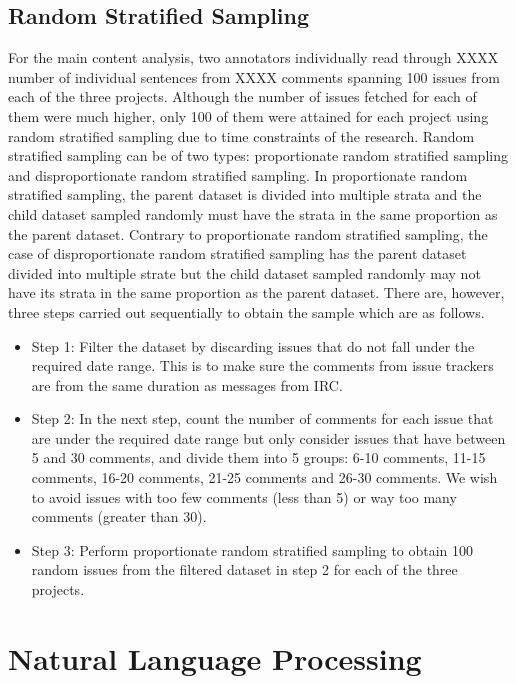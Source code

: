 \documentclass[a4paper,12pt,twoside]{report}
\begin{document}
\section{Random Stratified Sampling}
For the main content analysis, two annotators individually read through XXXX number of individual sentences from XXXX comments spanning 100 issues from each of the three projects. Although the number of issues fetched for each of them were much higher, only 100 of them were attained for each project using random stratified sampling due to time constraints of the research. Random stratified sampling can be of two types: proportionate random stratified sampling and disproportionate random stratified sampling. In proportionate random stratified sampling, the parent dataset is divided into multiple strata and the child dataset sampled randomly must have the strata in the same proportion as the parent dataset. Contrary to proportionate random stratified sampling, the case of disproportionate random stratified sampling has the parent dataset divided into multiple strate but the child dataset sampled randomly may not have its strata in the same proportion as the parent dataset. There are, however, three steps carried out sequentially to obtain the sample which are as follows.

\begin{itemize}
\item {Step 1:} Filter the dataset by discarding issues that do not fall under the required date range. This is to make sure the comments from issue trackers are from the same duration as messages from IRC. 
\item {Step 2:} In the next step, count the number of comments for each issue that are under the required date range but only consider issues that have between 5 and 30 comments, and divide them into 5 groups: 6-10 comments, 11-15 comments, 16-20 comments, 21-25 comments and 26-30 comments. We wish to avoid issues with too few comments (less than 5) or way too many comments (greater than 30). 
\item {Step 3:} Perform proportionate random stratified sampling to obtain 100 random issues from the filtered dataset in step 2 for each of the three projects.
\end{itemize}



\chapter{Natural Language Processing}
\end{document}
